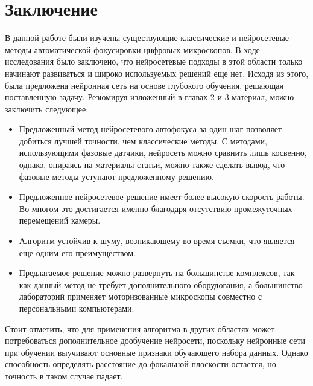 \chapter*{Заключение} \label{ch-conclusion}

В данной работе были изучены существующие классические и нейросетевые методы автоматической фокусировки цифровых микроскопов. В ходе исследования было заключено, что нейросетевые подходы в этой области только начинают развиваться и широко используемых решений еще нет. Исходя из этого, была предложена нейронная сеть на основе глубокого обучения, решающая поставленную задачу. Резюмируя изложенный в главах 2 и 3 материал, можно заключить следующее:
\begin{itemize}
	\item Предложенный метод нейросетевого автофокуса за один шаг позволяет добиться лучшей точности, чем классические методы. С методами, использующими фазовые датчики, нейросеть можно сравнить лишь косвенно, однако, опираясь на материалы статьи, можно также сделать вывод, что фазовые методы уступают предложенному решению.
	
	\item Предложенное нейросетевое решение имеет более высокую скорость работы. Во многом это достигается именно благодаря отсутствию промежуточных перемещений камеры.
	
	\item Алгоритм устойчив к шуму, возникающему во время съемки, что является еще одним его преимуществом.
	
	\item Предлагаемое решение можно развернуть на большинстве комплексов, так как данный метод не требует дополнительного оборудования, а большинство лабораторий применяет моторизованные микроскопы совместно с персональными компьютерами.
\end{itemize}

Стоит отметить, что для применения алгоритма в других областях может потребоваться дополнительное дообучение нейросети, поскольку нейронные сети при обучении выучивают основные признаки обучающего набора данных. Однако способность определять расстояние до фокальной плоскости остается, но точность в таком случае падает.